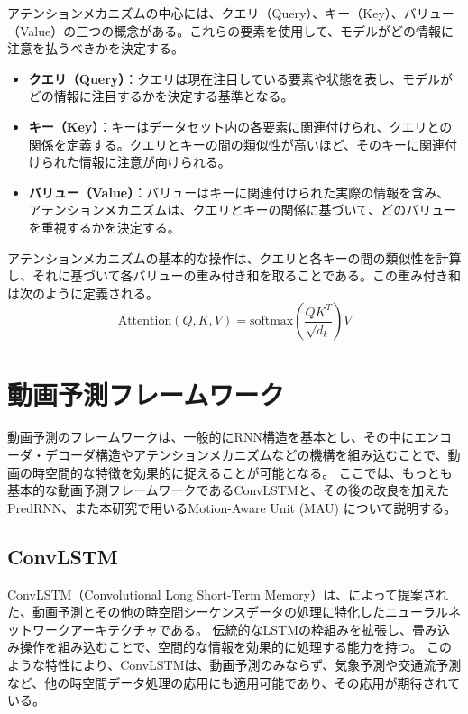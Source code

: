     アテンションメカニズムの中心には、クエリ（Query）、キー（Key）、バリュー（Value）の三つの概念がある。これらの要素を使用して、モデルがどの情報に注意を払うべきかを決定する。
    \begin{itemize}
      \item \textbf{クエリ（Query）}：クエリは現在注目している要素や状態を表し、モデルがどの情報に注目するかを決定する基準となる。
      \item \textbf{キー（Key）}：キーはデータセット内の各要素に関連付けられ、クエリとの関係を定義する。クエリとキーの間の類似性が高いほど、そのキーに関連付けられた情報に注意が向けられる。
      \item \textbf{バリュー（Value）}：バリューはキーに関連付けられた実際の情報を含み、アテンションメカニズムは、クエリとキーの関係に基づいて、どのバリューを重視するかを決定する。
    \end{itemize}

    アテンションメカニズムの基本的な操作は、クエリと各キーの間の類似性を計算し、それに基づいて各バリューの重み付き和を取ることである。この重み付き和は次のように定義される。
    \begin{equation}
      \text{Attention}(Q, K, V) = \text{softmax}\left(\frac{QK^T}{\sqrt{d_k}}\right)V
    \end{equation}

  \section{動画予測フレームワーク}
    動画予測のフレームワークは、一般的にRNN構造を基本とし、その中にエンコーダ・デコーダ構造やアテンションメカニズムなどの機構を組み込むことで、動画の時空間的な特徴を効果的に捉えることが可能となる。
    ここでは、もっとも基本的な動画予測フレームワークであるConvLSTMと、その後の改良を加えたPredRNN、また本研究で用いるMotion-Aware Unit (MAU) について説明する。

    \subsection{ConvLSTM}
      ConvLSTM（Convolutional Long Short-Term Memory）は、によって提案された、動画予測とその他の時空間シーケンスデータの処理に特化したニューラルネットワークアーキテクチャである。
      伝統的なLSTMの枠組みを拡張し、畳み込み操作を組み込むことで、空間的な情報を効果的に処理する能力を持つ。
      このような特性により、ConvLSTMは、動画予測のみならず、気象予測や交通流予測など、他の時空間データ処理の応用にも適用可能であり、その応用が期待されている。

